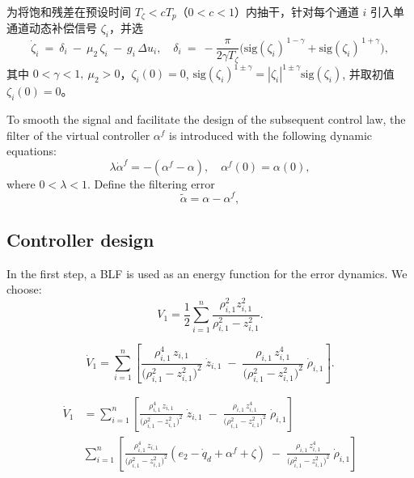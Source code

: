 \documentclass[pdflatex,sn-mathphys-num]{sn-jnl}%
\theoremstyle{thmstyleone}%
\theoremstyle{thmstyletwo}%
\theoremstyle{thmstylethree}%
\begin{document}
为将饱和残差在预设时间 $T_\zeta<cT_p$（$0<c<1$）内抽干，针对每个通道 $i$ 引入单通道动态补偿信号 $\zeta_{i}$，并选
\begin{equation}\label{eq:zeta2-pts}
\dot\zeta_i \ =\ \delta_i\ -\ \mu_2\,\zeta_i\ -\ g_i\,\Delta u_i,\quad
\delta_i\ =\ -\frac{\pi}{2\gamma T_\zeta}\Big(\mathrm{sig}(\zeta_i)^{\,1-\gamma}+\mathrm{sig}(\zeta_i)^{\,1+\gamma}\Big),
\end{equation}
其中 $0<\gamma<1,\ \mu_2>0$，$\zeta_i(0)=0$, $\mathrm{sig}(\zeta_i)^{1\pm \gamma}=|\zeta_i|^{1\pm \gamma}\mathrm{sig}(\zeta_i)$, 并取初值 $\zeta_{i}(0)=0$。



 To smooth the signal and facilitate the design of the subsequent control law, the filter of the virtual controller $\alpha^{f}$ is introduced with the following dynamic equations:
\begin{equation}\label{eq:22}
	\lambda \dot{\alpha}^{f}
	= -\left(\alpha^{f}-\alpha\right),
	\quad
	\alpha^{f}(0)=\alpha(0),
\end{equation}
where $0<\lambda<1$. Define the filtering error 
\begin{equation}\label{eq:23}
	\tilde{\alpha}= \alpha-\alpha^{f},
\end{equation}


\subsection{Controller design}



In the first step, a BLF is used as an energy function for the error dynamics. We choose:
\begin{equation}\label{eq:25}
	V_1= \frac{1}{2}\sum_{i=1}^{n} \frac{\rho_{i,1}^2 z_{i,1}^2}{\rho_{i,1}^2-z_{i,1}^2}. 
\end{equation}



$$
\boxed{\;
\dot V_1
=\sum_{i=1}^{n}\left[
\frac{\rho_{i,1}^4\,z_{i,1}}{\big(\rho_{i,1}^{2}-z_{i,1}^{2}\big)^{2}}\;\dot z_{i,1}
\;-\;
\frac{\rho_{i,1}\,z_{i,1}^{4}}{\big(\rho_{i,1}^{2}-z_{i,1}^{2}\big)^{2}}\;\dot \rho_{i,1}
\right].\;}
$$


\begin{equation}
\begin{aligned}
	\dot V_1
&=\sum_{i=1}^{n}\left[
\frac{\rho_{i,1}^4\,z_{i,1}}{\big(\rho_{i,1}^{2}-z_{i,1}^{2}\big)^{2}}\;\dot z_{i,1}
\;-\;
\frac{\rho_{i,1}\,z_{i,1}^{4}}{\big(\rho_{i,1}^{2}-z_{i,1}^{2}\big)^{2}}\;\dot \rho_{i,1}
\right]\\
& \sum_{i=1}^{n}\left[
\frac{\rho_{i,1}^4\,z_{i,1}}{\big(\rho_{i,1}^{2}-z_{i,1}^{2}\big)^{2}}(e_{2} - \dot{q}_{d}+\alpha^{f}+\zeta)
\;-\;
\frac{\rho_{i,1}\,z_{i,1}^{4}}{\big(\rho_{i,1}^{2}-z_{i,1}^{2}\big)^{2}}\;\dot \rho_{i,1}
\right]
\end{aligned}
\end{equation}
\end{document}
